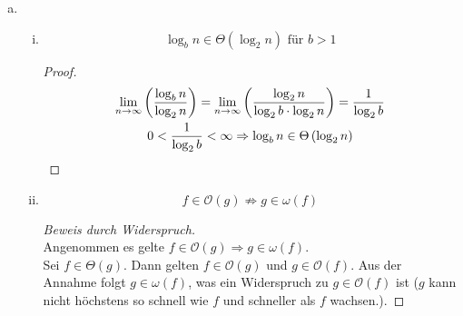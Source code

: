 \documentclass[a4paper]{scrartcl}
\begin{document}
\begin{enumerate}[(a)]
\begin{enumerate}[i.]
        \end{enumerate}

        \item
            \begin{enumerate}[(i)]
                \item
                    \begin{behaupt}
                        \begin{equation*}
                            \log_b n \in \Theta \left( \log_2 n \right) \text{ für } b > 1
                        \end{equation*}
                    \end{behaupt}
                    \begin{proof}
                        \begin{equation*}
                            \begin{gathered}
                                \lim_{n \to \infty} \left( \frac{\log_b n}{\log_2 n} \right)
                                = \lim_{n \to \infty} \left( \frac{\log_2 n}{\log_2 b \cdot \log_2 n} \right)
                                = \frac{1}{\log_2 b} \\
                                0 < \frac{1}{\log_2 b} < \infty
                                \Rightarrow \log_b n \in \Theta \left( \log_2 n \right)
                            \end{gathered}
                        \end{equation*}
                    \end{proof}

                \item
                    \begin{behaupt}
                        \begin{equation}
                            f \in \mathcal{O}(g) \not\Rightarrow g \in \omega(f)
                        \end{equation}
                    \end{behaupt}
                    \begin{proof}[Beweis durch Widerspruch] \hfill \\
                        Angenommen es gelte $f \in \mathcal{O}(g) \Rightarrow g \in \omega(f)$. \\
                        Sei $f \in \Theta(g)$.
                        Dann gelten $f \in \mathcal{O}(g)$ und $g \in \mathcal{O}(f)$.
                        Aus der Annahme folgt $g \in \omega(f)$, was ein
                        Widerspruch zu $g \in \mathcal{O}(f)$ ist
                        ($g$ kann nicht höchstens so schnell wie $f$ und schneller
                        als $f$ wachsen.).
                    \end{proof}


\end{enumerate}
\end{enumerate}
\end{document}

